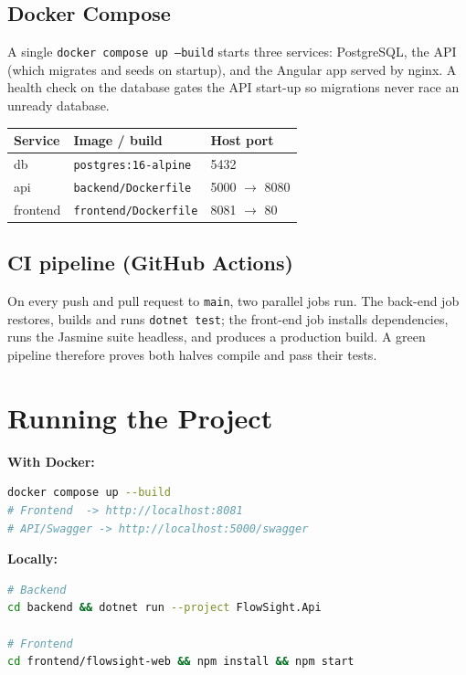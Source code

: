 \documentclass[11pt,a4paper]{article}
\newcommand{\code}[1]{\texttt{\small #1}}
\begin{document}
\subsection{Docker Compose}
A single \code{docker compose up --build} starts three services: PostgreSQL, the
API (which migrates and seeds on startup), and the Angular app served by nginx.
A health check on the database gates the API start-up so migrations never race
an unready database.

\begin{center}
\begin{tabular}{@{}lll@{}}
\toprule
\textbf{Service} & \textbf{Image / build} & \textbf{Host port} \\
\midrule
db       & \code{postgres:16-alpine}    & 5432 \\
api      & \code{backend/Dockerfile}    & 5000 $\rightarrow$ 8080 \\
frontend & \code{frontend/Dockerfile}   & 8081 $\rightarrow$ 80 \\
\bottomrule
\end{tabular}
\end{center}

\subsection{CI pipeline (GitHub Actions)}
On every push and pull request to \code{main}, two parallel jobs run. The
back-end job restores, builds and runs \code{dotnet test}; the front-end job
installs dependencies, runs the Jasmine suite headless, and produces a
production build. A green pipeline therefore proves both halves compile and pass
their tests.

\section{Running the Project}
\textbf{With Docker:}
\begin{lstlisting}[language=bash]
docker compose up --build
# Frontend  -> http://localhost:8081
# API/Swagger -> http://localhost:5000/swagger
\end{lstlisting}

\textbf{Locally:}
\begin{lstlisting}[language=bash]
# Backend
cd backend && dotnet run --project FlowSight.Api

# Frontend
cd frontend/flowsight-web && npm install && npm start
\end{lstlisting}
\end{document}
